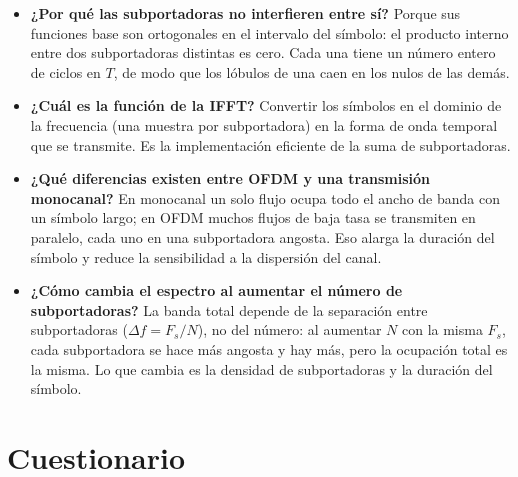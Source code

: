 \documentclass[11pt,a4paper]{article}
\begin{document}
\begin{itemize}
  \item \textbf{¿Por qué las subportadoras no interfieren entre sí?} Porque sus funciones
        base son ortogonales en el intervalo del símbolo: el producto interno entre dos
        subportadoras distintas es cero. Cada una tiene un número entero de ciclos en $T$,
        de modo que los lóbulos de una caen en los nulos de las demás.
  \item \textbf{¿Cuál es la función de la IFFT?} Convertir los símbolos en el dominio de la
        frecuencia (una muestra por subportadora) en la forma de onda temporal que se
        transmite. Es la implementación eficiente de la suma de subportadoras.
  \item \textbf{¿Qué diferencias existen entre OFDM y una transmisión monocanal?} En
        monocanal un solo flujo ocupa todo el ancho de banda con un símbolo largo; en OFDM
        muchos flujos de baja tasa se transmiten en paralelo, cada uno en una subportadora
        angosta. Eso alarga la duración del símbolo y reduce la sensibilidad a la
        dispersión del canal.
  \item \textbf{¿Cómo cambia el espectro al aumentar el número de subportadoras?} La banda
        total depende de la separación entre subportadoras ($\Delta f = F_s/N$), no del
        número: al aumentar $N$ con la misma $F_s$, cada subportadora se hace más angosta
        y hay más, pero la ocupación total es la misma. Lo que cambia es la densidad de
        subportadoras y la duración del símbolo.
\end{itemize}

\section{Cuestionario}
\end{document}
